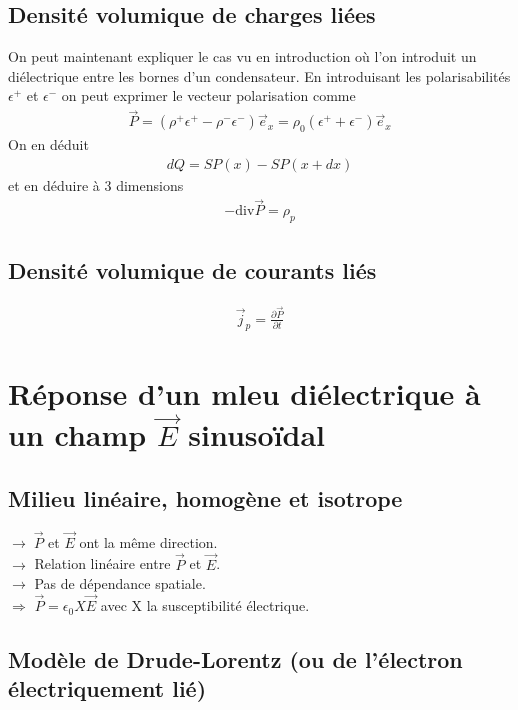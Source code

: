 \documentclass[12pt,prb,aps,epsf]{report}
\begin{document}
\subsection{Densité volumique de charges liées} On peut maintenant expliquer le cas vu en introduction où l'on introduit un diélectrique entre les bornes d'un condensateur. En introduisant les polarisabilités $\epsilon^+$ et $\epsilon^-$ on peut exprimer le vecteur polarisation comme 
\begin{eqnarray}
\vec{P} = (\rho^+\epsilon^+ - \rho^-\epsilon^-)\vec{e}_x = \rho_0(\epsilon^++\epsilon^-)\vec{e}_x
\end{eqnarray}
On en déduit 
\begin{eqnarray}
dQ = SP(x) - SP(x+dx)
\end{eqnarray}
et en déduire à 3 dimensions 
\begin{eqnarray}
-\mathrm{div}\vec{P} = \rho_p
\end{eqnarray}

\subsection{Densité volumique de courants liés}
\begin{eqnarray}
\vec{j}_p = \frac{\partial\vec{P}}{\partial t}
\end{eqnarray}

\section{Réponse d'un mleu diélectrique à un champ $\vec{E}$ sinusoïdal}
\subsection{Milieu linéaire, homogène et isotrope}
$\rightarrow\; \vec{P}$ et $\vec{E}$ ont la même direction.\\
$\rightarrow$ Relation linéaire entre $\vec{P}$ et $\vec{E}$.\\
$\rightarrow$ Pas de dépendance spatiale.\\

$\Rightarrow$ $\vec{P} = \epsilon_0 X \vec{E}$ avec X la susceptibilité électrique.\\

\subsection{Modèle de Drude-Lorentz (ou de l'électron électriquement lié)}
\end{document}
